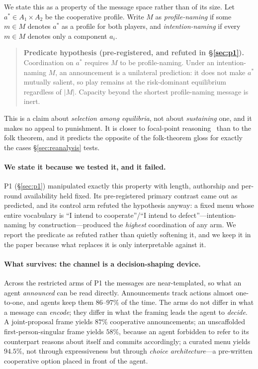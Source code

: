 We state this as a property of the message space rather than of its size. Let
$a^\ast \in A_1 \times A_2$ be the cooperative profile. Write $M$ as \emph{profile-naming}
if some $m \in M$ denotes $a^\ast$ as a profile for both players, and
\emph{intention-naming} if every $m \in M$ denotes only a component $a_i$.

\begin{quote}
\textbf{Predicate hypothesis (pre-registered, and refuted in \S\ref{sec:p1}).}
Coordination on $a^\ast$ requires $M$ to be profile-naming. Under an intention-naming
$M$, an announcement is a unilateral prediction: it does not make $a^\ast$ mutually
salient, so play remains at the risk-dominant equilibrium regardless of $|M|$.
Capacity beyond the shortest profile-naming message is inert.
\end{quote}

This is a claim about \emph{selection among equilibria}, not about \emph{sustaining}
one, and it makes no appeal to punishment. It is closer to focal-point
reasoning~\cite{schelling1960strategy} than to the folk theorem, and it predicts the
opposite of the folk-theorem gloss for exactly the cases \S\ref{sec:reanalysis} tests.

\paragraph{We state it because we tested it, and it failed.}
P1 (\S\ref{sec:p1}) manipulated exactly this property with length, authorship and
per-round availability held fixed. Its pre-registered primary contrast came out as
predicted, and its control arm refuted the hypothesis anyway: a fixed menu whose entire
vocabulary is ``I intend to cooperate''/``I intend to defect''---intention-naming by
construction---produced the \emph{highest} coordination of any arm. We report the
predicate as refuted rather than quietly softening it, and we keep it in the paper
because what replaces it is only interpretable against it.

\paragraph{What survives: the channel is a decision-shaping device.}
Across the restricted arms of P1 the messages are near-templated, so what an agent
\emph{announced} can be read directly. Announcements track actions almost
one-to-one, and agents keep them $86$--$97\%$ of the time. The arms do not differ in
what a message can \emph{encode}; they differ in what the framing leads the agent to
\emph{decide}. A joint-proposal frame yields $87\%$ cooperative announcements; an
unscaffolded first-person-singular frame yields $58\%$, because an agent forbidden to
refer to its counterpart reasons about itself and commits accordingly; a curated menu
yields $94.5\%$, not through expressiveness but through \emph{choice architecture}---a
pre-written cooperative option placed in front of the agent.

